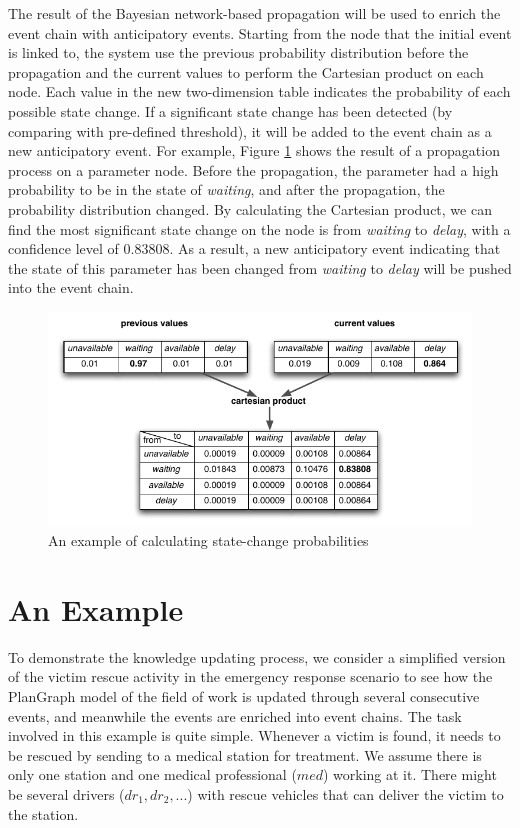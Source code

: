 The result of the Bayesian network-based propagation will be used to enrich the event chain with anticipatory events. Starting from the node that the initial event is linked to, the system use the previous probability distribution before the propagation and the current values to perform the Cartesian product on each node. Each value in the new two-dimension table indicates the probability of each possible state change. If a significant state change has been detected (by comparing with pre-defined threshold), it will be added to the event chain as a new anticipatory event. For example, Figure \ref{fig:prob_state_change} shows the result of a propagation process on a parameter node. Before the propagation, the parameter had a high probability to be in the state of \emph{waiting}, and after the propagation, the probability distribution changed. By calculating the Cartesian product, we can find the most significant state change on the node is from \emph{waiting} to \emph{delay}, with a confidence level of $0.83808$. As a result, a new anticipatory event indicating that the state of this parameter has been changed from \emph{waiting} to \emph{delay} will be pushed into the event chain.
\begin{figure}[htbp] %
	\centering
	\includegraphics{prob_state_change.pdf} 
	\caption{An example of calculating state-change probabilities}
	\label{fig:prob_state_change}
\end{figure}
\section{An Example} %
\label{sec:an_example}
To demonstrate the knowledge updating process, we consider a simplified version of the victim rescue activity in the emergency response scenario to see how the PlanGraph model of the field of work is updated through several consecutive events, and meanwhile the events are enriched into event chains. The task involved in this example is quite simple. Whenever a victim is found, it needs to be rescued by sending to a medical station for treatment. We assume there is only one station and one medical professional ($med$) working at it. There might be several drivers ($dr_1, dr_2, ...$) with rescue vehicles that can deliver the victim to the station.   

